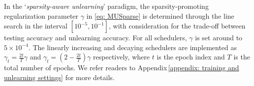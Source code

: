 \fi
\iffalse
\JH{In the `\textit{sparsity-aware unlearning}' paradigm,  the sparsity-promoting regularization parameter $\gamma$  in   \eqref{eq: MUSparse} is set to   $\gamma = 5\times10^{-5}$ if it is given by a constant, $\gamma=9\times10^{-5}$ for linear decaying scheduler, and $\gamma=1\times10^{-4}$ for linear increasing scheduler. They are found by a line search over $[10^{-5}, 10^{-1}]$ across  trade-offs between testing accuracy and unlearning accuracy. 
We implement the linearly decaying scheduler by $\gamma_t = (1 - \frac{t}{T})\gamma$, where $t$ is the epoch index, and $T$ is the total number of  epochs. The linearly increasing scheduler is similarly given by $\gamma_t = \frac{t}{T} \gamma$ in Tab.\,\ref{tab: ablation_l1_scheduler}.}
\JC{Need update @Jinghan}
\fi
In the `\textit{sparsity-aware unlearning}' paradigm, the sparsity-promoting regularization parameter $\gamma$ in \eqref{eq: MUSparse} is determined through the line search in the interval $[10^{-5}, 10^{-1}]$, with consideration for the trade-off between testing accuracy and unlearning accuracy. For all schedulers, $\gamma$ is set around to $5 \times 10^{-4}$. The linearly increasing and decaying schedulers are implemented as $\gamma_t = \frac{2t}{T} \gamma$ and $\gamma_t = (2 - \frac{2t}{T})\gamma$ respectively, where $t$ is the epoch index and $T$ is the total number of epochs. 
We refer readers to Appendix\,\ref{appendix: training and unlearning settings} for more details. 






